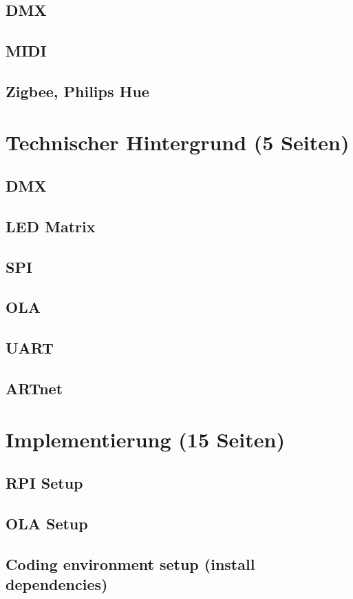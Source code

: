 \section{DMX}
\section{MIDI}
\section{Zigbee, Philips Hue}

\chapter{Technischer Hintergrund (5 Seiten)}
\section{DMX}
\section{LED Matrix}
\section{SPI}
\section{OLA}
\section{UART}
\section{ARTnet}

\chapter{Implementierung (15 Seiten)}
\section{RPI Setup}
\section{OLA Setup}
\section{Coding environment setup (install dependencies)}
